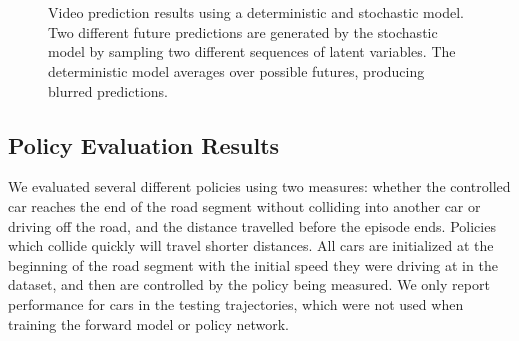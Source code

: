\documentclass{article} %
\begin{document}
\begin{figure}[t!]
    \centering
     \\
     \\
    \caption{Video prediction results using a deterministic and stochastic model. Two different future predictions are generated by the stochastic model by sampling two different sequences of latent variables. The deterministic model averages over possible futures, producing blurred predictions.}
    \label{prediction-results}
\end{figure}









    \subsection{Policy Evaluation Results}

    We evaluated several different policies using two measures: whether the controlled car reaches the end of the road segment without colliding into another car or driving off the road, and the distance travelled before the episode ends. Policies which collide quickly will travel shorter distances. All cars are initialized at the beginning of the road segment with the initial speed they were driving at in the dataset, and then are controlled by the policy being measured. We only report performance for cars in the testing trajectories, which were not used when training the forward model or policy network.
\end{document}
